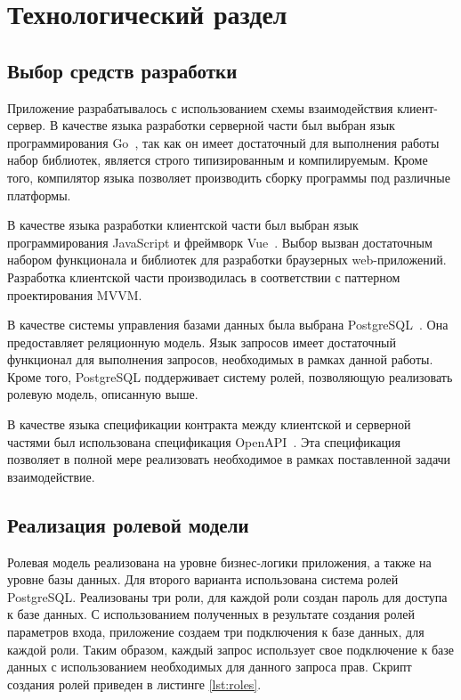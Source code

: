 \chapter{Технологический раздел}

\section{Выбор средств разработки}

Приложение разрабатывалось с использованием схемы взаимодействия клиент-сервер. В качестве языка разработки серверной части был выбран язык программирования Go~\cite{golang}, так как он имеет достаточный для выполнения работы набор библиотек, является строго типизированным и компилируемым. Кроме того, компилятор языка позволяет производить сборку программы под различные платформы.

В качестве языка разработки клиентской части был выбран язык программирования JavaScript и фреймворк Vue~\cite{vuejs}. Выбор вызван достаточным набором функционала и библиотек для разработки браузерных web-приложений. Разработка клиентской части производилась в соответствии с паттерном проектирования MVVM.

В качестве системы управления базами данных была выбрана PostgreSQL~\cite{postgresql}. Она предоставляет реляционную модель. Язык запросов имеет достаточный функционал для выполнения запросов, необходимых в рамках данной работы. Кроме того, PostgreSQL поддерживает систему ролей, позволяющую реализовать ролевую модель, описанную выше.

В качестве языка спецификации контракта между клиентской и серверной частями был использована спецификация OpenAPI~\cite{openapi}. Эта спецификация позволяет в полной мере реализовать необходимое в рамках поставленной задачи взаимодействие. 

\section{Реализация ролевой модели}

Ролевая модель реализована на уровне бизнес-логики приложения, а также на уровне базы данных. Для второго варианта использована система ролей PostgreSQL. Реализованы три роли, для каждой роли создан пароль для доступа к базе данных. С использованием полученных в результате создания ролей параметров входа, приложение создаем три подключения к базе данных, для каждой роли. Таким образом, каждый запрос использует свое подключение к базе данных с использованием необходимых для данного запроса прав. Скрипт создания ролей приведен в листинге \ref{lst:roles}.

